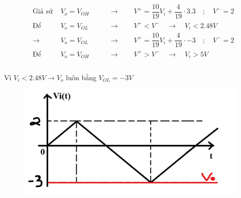 \[
\begin{aligned}
&\text{Giả sử }& V_o = V_{OH} &\qquad\rightarrow\qquad V^+ = \dfrac{10}{19}V_i + \dfrac{4}{19}\cdot3.3 \quad;\quad V^- = 2 \\
&\text{Để }& V_o = V_{OL} &\qquad\rightarrow\qquad V^+ < V^- \quad\rightarrow\quad \boxed{V_i<2.48V}\\
&\rightarrow& V_o = V_{OL} &\qquad\rightarrow\qquad V^+ = \dfrac{10}{19}V_i + \dfrac{4}{19}\cdot-3 \quad;\quad V^- = 2 \\
&\text{Để }& V_o = V_{OH} &\qquad\rightarrow\qquad V^+ > V^- \quad\rightarrow\quad \boxed{V_i>5V}\\
\end{aligned}
\]\\
Vì $V_i<2.48V \rightarrow V_o$ luôn bằng $V_{OL}=-3V$ 
\begin{figure}[H]
	\centering
	\includegraphics[scale=0.6]{image/C12_a_BT.png}
\end{figure}


